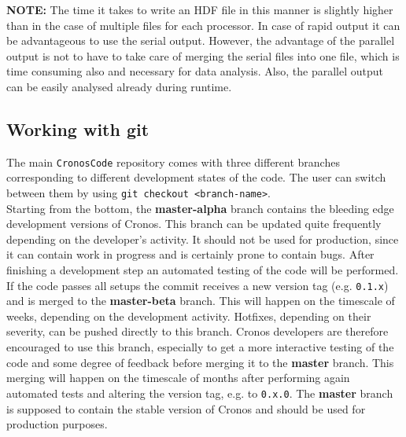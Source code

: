 {\bf NOTE:} The time it takes to write an HDF file in this manner is
slightly higher than in the case of multiple files for each processor. In
case of rapid output it can be advantageous to use the serial output.
However, the advantage of the parallel output is not to have to take care of
merging the serial files into one file, which is time consuming also and
necessary for data analysis. Also, the parallel output can be easily
analysed already during runtime.  



\subsection{Working with git}
The main {\tt CronosCode} repository comes with three different branches corresponding to different
development states of the code. The user can switch between them by using
{\tt git checkout <branch-name>}.\\
Starting from the bottom, the {\bf master-alpha} branch contains the bleeding edge development
versions of Cronos.
This branch can be updated quite frequently depending on the developer's activity.
It should not be used for production, since it can contain work in progress and is certainly prone
to contain bugs. After finishing a development step an automated testing of the code will be
performed. If the code passes all setups the commit receives a new version tag (e.g. {\tt 0.1.x})
and is merged to the {\bf master-beta} branch. This will happen on the timescale of weeks,
depending on the development activity.
Hotfixes, depending on their severity, can be pushed directly to this branch.
Cronos developers are therefore encouraged to use this branch, especially to get a more
interactive testing of the code and some degree of feedback before merging it to the {\bf master}
branch.
This merging will happen on the timescale of months after performing again automated tests and
altering the version tag, e.g. to {\tt 0.x.0}.
The {\bf master} branch is supposed to contain the stable version of Cronos and should be used for
production purposes.
